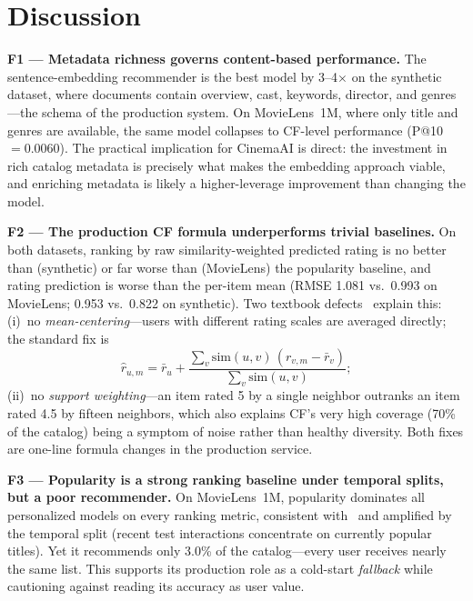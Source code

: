 \documentclass[conference]{IEEEtran}
\begin{document}
\section{Discussion}\label{sec:discussion}

\textbf{F1 --- Metadata richness governs content-based performance.} The
sentence-embedding recommender is the best model by 3--4$\times$ on the
synthetic dataset, where documents contain overview, cast, keywords, director,
and genres---the schema of the production system. On MovieLens~1M, where only
title and genres are available, the same model collapses to CF-level
performance (P@10 $= 0.0060$). The practical implication for CinemaAI is
direct: the investment in rich catalog metadata is precisely what makes the
embedding approach viable, and enriching metadata is likely a higher-leverage
improvement than changing the model.

\textbf{F2 --- The production CF formula underperforms trivial baselines.} On
both datasets, ranking by raw similarity-weighted predicted rating is no better
than (synthetic) or far worse than (MovieLens) the popularity baseline, and
rating prediction is worse than the per-item mean (RMSE 1.081 vs.\ 0.993 on
MovieLens; 0.953 vs.\ 0.822 on synthetic). Two textbook
defects~\cite{herlocker2004evaluating} explain this: (i)~no
\emph{mean-centering}---users with different rating scales are averaged
directly; the standard fix is
\begin{equation}
\hat{r}_{u,m}=\bar{r}_u+
\frac{\sum_{v}\mathrm{sim}(u,v)\,(r_{v,m}-\bar{r}_v)}
{\sum_{v}\mathrm{sim}(u,v)};
\end{equation}
(ii)~no \emph{support weighting}---an item rated 5 by a single neighbor
outranks an item rated 4.5 by fifteen neighbors, which also explains CF's very
high coverage (70\% of the catalog) being a symptom of noise rather than
healthy diversity. Both fixes are one-line formula changes in the production
service.

\textbf{F3 --- Popularity is a strong ranking baseline under temporal splits,
but a poor recommender.} On MovieLens~1M, popularity dominates all personalized
models on every ranking metric, consistent
with~\cite{cremonesi2010performance} and amplified by the temporal split
(recent test interactions concentrate on currently popular titles). Yet it
recommends only 3.0\% of the catalog---every user receives nearly the same
list. This supports its production role as a cold-start \emph{fallback} while
cautioning against reading its accuracy as user value.
\end{document}

